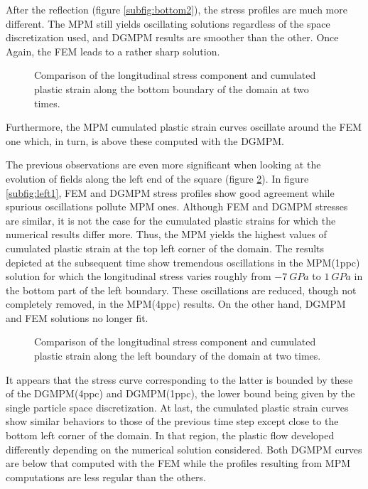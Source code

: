 After the reflection (figure \ref{subfig:bottom2}), the stress profiles are much more different.
The MPM still yields oscillating solutions regardless of the space discretization used, and DGMPM results are smoother than the other.
Once Again, the FEM leads to a rather sharp solution.
\begin{figure}[ht]
  \centering
  {}
  {}
  
  \caption{Comparison of the longitudinal stress component and cumulated plastic strain along the bottom boundary of the domain at two times.}
  \label{fig:bottom_line}
\end{figure}
Furthermore, the MPM cumulated plastic strain curves oscillate around the FEM one which, in turn, is above these computed with the DGMPM.

The previous observations are even more significant when looking at the evolution of fields along the left end of the square (figure \ref{fig:left_line}).
In figure \ref{subfig:left1}, FEM and DGMPM stress profiles show good agreement while spurious oscillations pollute MPM ones. 
Although FEM and DGMPM stresses are similar, it is not the case for the cumulated plastic strains for which the numerical results differ more.
Thus, the MPM yields the highest values of cumulated plastic strain at the top left corner of the domain.
The results depicted at the subsequent time show tremendous oscillations in the MPM(1ppc) solution for which the longitudinal stress varies roughly from $-7 \: GPa$ to $1 \: GPa$ in the bottom part of the left boundary.
These oscillations are reduced, though not completely removed, in the MPM(4ppc) results. 
On the other hand, DGMPM and FEM solutions no longer fit.
\begin{figure}[ht]
  \centering
  {}
  {}
  
  \caption{Comparison of the longitudinal stress component and cumulated plastic strain along the left boundary of the domain at two times.}
  \label{fig:left_line}
\end{figure}
It appears that the stress curve corresponding to the latter is bounded by these of the DGMPM(4ppc) and DGMPM(1ppc), the lower bound being given by the single particle space discretization.
At last, the cumulated plastic strain curves show similar behaviors to those of the previous time step except close to the bottom left corner of the domain.
In that region, the plastic flow developed differently depending on the numerical solution considered.
Both DGMPM curves are below that computed with the FEM while the profiles resulting from MPM computations are less regular than the others.

